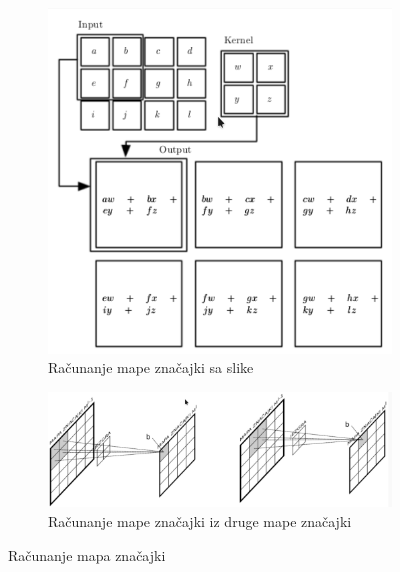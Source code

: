 \begin{figure}[htb]
	\centering
	\begin{subfigure}[b]{0.8\linewidth}
		\includegraphics[width=\linewidth]{img/ConvExample.png}
		\caption{Računanje mape značajki sa slike \citep{duPredavanja}}
		\label{img:feature_map1}
	\end{subfigure}
	\begin{subfigure}[b]{0.8\linewidth}
		\includegraphics[width=\linewidth]{img/ConvExample2.png}
		\caption{Računanje mape značajki iz druge mape značajki \citep{duPredavanja}}
		\label{img:feature_map2}
	\end{subfigure}
	\caption{Računanje mapa značajki}
	\label{img:feature_map}
\end{figure}

